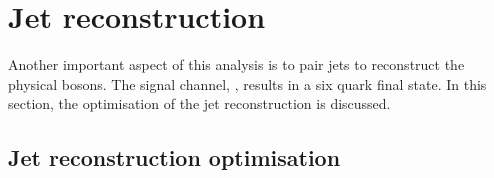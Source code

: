 \section{Jet reconstruction}

Another important aspect of this analysis is to pair jets to reconstruct the physical bosons. The signal channel, \eeToHHbbWWHad, results in a six quark final state.  In this section, the optimisation of the jet reconstruction is discussed.




\subsection{Jet reconstruction optimisation}
\label{sec:doubleHiggsJetOptimisation}

